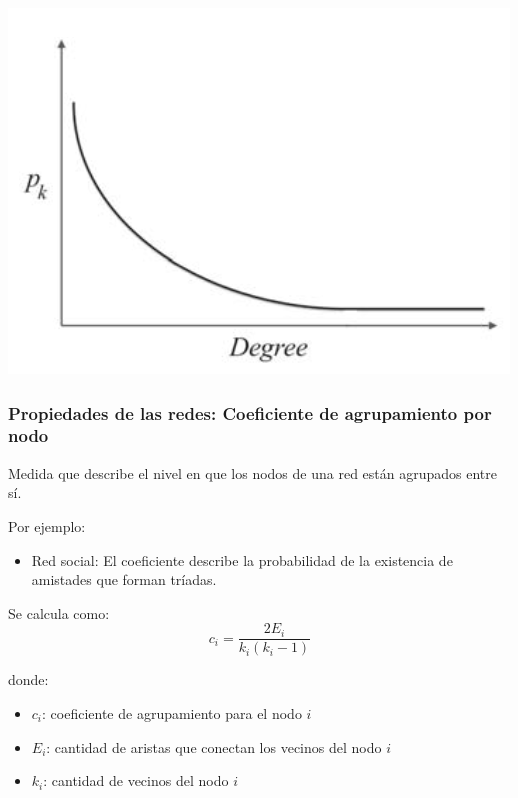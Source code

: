\documentclass[
10pt, %
aspectratio=169, %
]{beamer}
\begin{document}
\begin{frame}
\begin{minipage}{0.45\textwidth}
			\centering
			
			\includegraphics[scale=0.4]{power-law.png}
			
		\end{minipage}%
			
		
	\end{frame}
	
	\begin{frame}
		
		\frametitle{Propiedades de las redes: Coeficiente de agrupamiento por nodo}
		
		\begin{alertblock}{}
			Medida que describe el nivel en que los nodos de una red están agrupados entre sí.
		\end{alertblock}
		
		\vspace{1\baselineskip}
		Por ejemplo:
		\begin{itemize}
			\item Red social: El coeficiente describe la probabilidad de la existencia de amistades que forman tríadas.
		\end{itemize}
		
		\vspace{1\baselineskip}
		Se calcula como:
		$$c_i = \frac{2E_i}{k_i(k_i - 1)}$$
	
		donde:
		\begin{itemize}
			\item $c_i$: coeficiente de agrupamiento para el nodo $i$
			\item $E_i$: cantidad de aristas que conectan los vecinos del nodo $i$
			\item $k_i$: cantidad de vecinos del nodo $i$
		\end{itemize}
		
	\end{frame}
	
\end{document}
